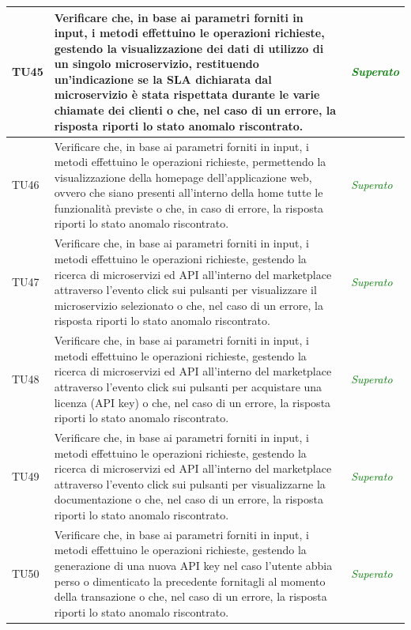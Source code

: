 \begin{longtable}{|>{\centering\arraybackslash}p{1.5cm}|>{\centering\arraybackslash}p{8cm} | >{\centering\arraybackslash}p{3.8cm}|}
		\hypertarget{TU45}{TU45} & Verificare che, in base ai parametri forniti in input, i metodi effettuino le operazioni richieste, gestendo la visualizzazione dei dati di utilizzo di un singolo microservizio, restituendo un'indicazione se la SLA dichiarata dal microservizio è stata rispettata durante le varie chiamate dei clienti o che, nel caso di un errore, la risposta riporti lo stato anomalo riscontrato. & \textcolor{Green}{\textit{Superato}}\\ \hline
		\hypertarget{TU46}{TU46} & Verificare che, in base ai parametri forniti in input, i metodi effettuino le operazioni richieste, permettendo la visualizzazione della homepage dell'applicazione web, ovvero che siano presenti all'interno della home tutte le funzionalità previste o che, in caso di errore, la risposta riporti lo stato anomalo riscontrato. & \textcolor{Green}{\textit{Superato}}\\ \hline
		\hypertarget{TU47}{TU47} & Verificare che, in base ai parametri forniti in input, i metodi effettuino le operazioni richieste, gestendo la ricerca di microservizi ed API all'interno del marketplace attraverso l'evento click sui pulsanti per visualizzare il microservizio selezionato o che, nel caso di un errore, la risposta riporti lo stato anomalo riscontrato. & \textcolor{Green}{\textit{Superato}}\\ \hline
		\hypertarget{TU48}{TU48} & Verificare che, in base ai parametri forniti in input, i metodi effettuino le operazioni richieste, gestendo la ricerca di microservizi ed API all'interno del marketplace attraverso l'evento click sui pulsanti per acquistare una licenza (API key) o che, nel caso di un errore, la risposta riporti lo stato anomalo riscontrato. & \textcolor{Green}{\textit{Superato}}\\ \hline
		\hypertarget{TU49}{TU49} & Verificare che, in base ai parametri forniti in input, i metodi effettuino le operazioni richieste, gestendo la ricerca di microservizi ed API all'interno del marketplace attraverso l'evento click sui pulsanti per visualizzarne la documentazione o che, nel caso di un errore, la risposta riporti lo stato anomalo riscontrato. & \textcolor{Green}{\textit{Superato}}\\ \hline
		\hypertarget{TU50}{TU50} & Verificare che, in base ai parametri forniti in input, i metodi effettuino le operazioni richieste, gestendo la generazione di una nuova API key nel caso l'utente abbia perso o dimenticato la precedente fornitagli al momento della transazione o che, nel caso di un errore, la risposta riporti lo stato anomalo riscontrato. & \textcolor{Green}{\textit{Superato}}\\ \hline

\end{longtable}
